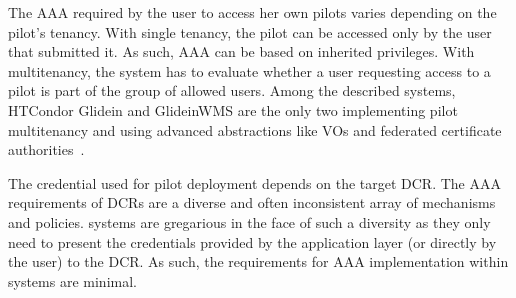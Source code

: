 \documentclass{sig-alternate}
\begin{document}
The AAA required by the user to access her own pilots varies depending on the
pilot's tenancy. With single tenancy, the pilot can be accessed only by the user
that submitted it. As such, AAA can be based on inherited privileges. With
multitenancy, the \pilot system has to evaluate whether a user requesting access
to a pilot is part of the group of allowed users. Among the described \pilot
systems, HTCondor Glidein and GlideinWMS are the only two implementing pilot
multitenancy and using advanced abstractions like VOs and federated certificate
authorities~\cite{horwitz2002}.

The credential used for pilot deployment depends on the target DCR. The AAA
requirements of DCRs are a diverse and often inconsistent array of mechanisms
and policies. \pilot systems are gregarious in the face of such a diversity as
they only need to present the credentials provided by the application layer (or
directly by the user) to the DCR. As such, the requirements for AAA
implementation within \pilot systems are minimal.



%





\end{document}
